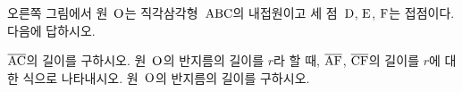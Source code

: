 \noindent\begin{minipage}[t]{0.58\linewidth}\vspace{0pt}\raggedright 오른쪽 그림에서 원~$\mathrm{O}$는 직각삼각형~$\mathrm{ABC}$의 내접원이고 세 점~$\mathrm{D}$, $\mathrm{E}$, $\mathrm{F}$는 접점이다. 다음에 답하시오.\end{minipage}\hfill\begin{minipage}[t]{0.4\linewidth}\vspace{0pt}\centering \resizebox{\ifdim\width>\linewidth\linewidth\else\width\fi}{!}{}\end{minipage}\par
{} $\overline{\mathrm{AC}}$의 길이를 구하시오.
 원~$\mathrm{O}$의 반지름의 길이를 $r$라 할 때, $\overline{\mathrm{AF}}$, $\overline{\mathrm{CF}}$의 길이를 $r$에 대한 식으로 나타내시오.
 원~$\mathrm{O}$의 반지름의 길이를 구하시오.
